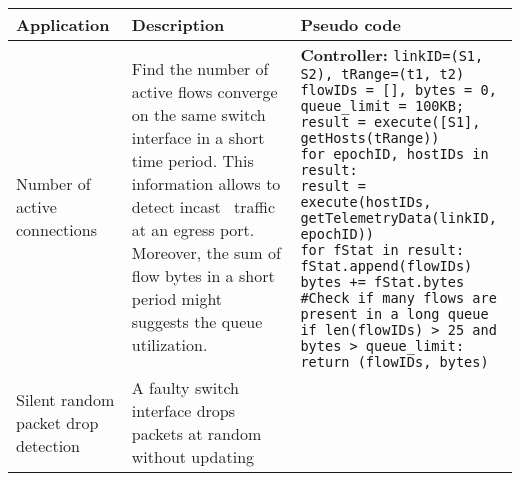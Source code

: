 \newpage
\begin{table}[!h]
{\small
{}
\begin{tabular}{C{2cm} L{5cm} L{10cm}}
\toprule
  \textbf{Application}  &  \textbf{Description}  &  \textbf{Pseudo code} \\
\midrule \midrule

Number of active 
connections 			&  Find the number of active flows converge on the same switch interface in a short time period. This information allows to detect incast~\cite{dctcp} traffic at an egress port. Moreover, the sum of flow bytes in a short period might suggests the queue utilization.
						&  \textbf{Controller:} \newline
						   \texttt{linkID=(S1, S2), tRange=(t1, t2) \newline
							flowIDs = [], bytes = 0, queue\_limit = 100KB; \newline	result = execute([S1], getHosts(tRange)) \newline
							for epochID, hostIDs in result: \newline
							\hspace{0.3cm} result = execute(hostIDs, \newline
							\hspace{0.3cm} \hspace{0.6cm} getTelemetryData(linkID, epochID)) \newline
							\hspace{0.3cm} for fStat in result: \newline
							\hspace{0.3cm} \hspace{0.3cm} fStat.append(flowIDs) \newline
							\hspace{0.3cm} \hspace{0.3cm} bytes += fStat.bytes \newline
							\#Check if many flows are present in a long queue \newline
							if len(flowIDs) > 25 and bytes > queue\_limit: \newline
								\hspace{0.3cm} return (flowIDs, bytes)
							} \\
\midrule
Silent random packet drop detection ~\cite{everflow} & A faulty switch interface drops packets at random without updating

\end{tabular}}
\end{table}

